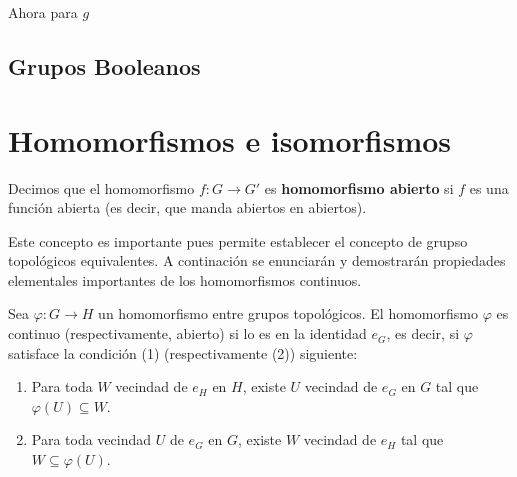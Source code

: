\documentclass[12pt]{report}
\theoremstyle{largebreak}
\newcommand{\cf}[3]{\ensuremath{#1:#2\rightarrow#3}}
\begin{document}
    Ahora para $g$

    \subsection{Grupos Booleanos}

    \section{Homomorfismos e isomorfismos}

    \begin{mydef}
        Decimos que el homomorfismo $\cf{f}{G}{G'}$ es \textbf{homomorfismo abierto} si $f$ es una función abierta (es decir, que manda abiertos en abiertos).
    \end{mydef}

    Este concepto es importante pues permite establecer el concepto de grupso topológicos equivalentes. A continación se enunciarán y demostrarán propiedades elementales importantes de los homomorfismos continuos.

    \begin{lema}
        Sea $\cf{\varphi}{G}{H}$ un homomorfismo entre grupos topológicos. El homomorfismo $\varphi$ es continuo (respectivamente, abierto) si lo es en la identidad $e_G$, es decir, si $\varphi$ satisface la condición (1) (respectivamente (2)) siguiente:
        \begin{enumerate}
            \item Para toda $W$ vecindad de $e_H$ en $H$, existe $U$ vecindad de $e_G$ en $G$ tal que $\varphi(U)\subseteq W$.
            \item Para toda vecindad $U$ de $e_G$ en $G$, existe $W$ vecindad de $e_H$ tal que $W\subseteq\varphi(U)$.
        \end{enumerate}
    \end{lema}
\end{document}

